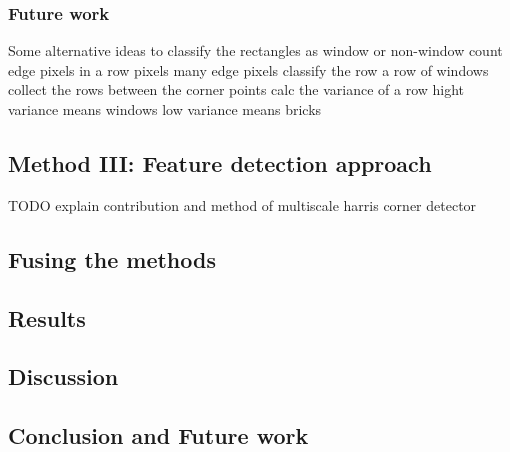 \subsubsection{Future work}
Some alternative ideas to classify the rectangles as window or non-window
	count edge pixels in a row pixels
		many edge pixels classify the row a row of windows
		collect the rows between the corner points
	calc the variance of a row
		hight variance means windows
		low variance means bricks


\subsection{Method III: Feature detection approach}
	TODO explain contribution and method of multiscale harris corner detector

\subsection{Fusing the methods}

\subsection{Results}
\subsection{Discussion}  %
\subsection{Conclusion and Future work}




% 
% 
% 
% 
% 
% 
% 
% 

